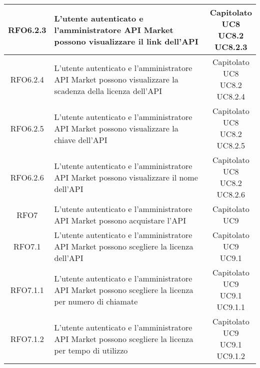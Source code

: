 \begin{longtable}{|c|p{8cm}|c|}
RFO6.2.3 &  L'utente autenticato e l'amministratore API Market possono visualizzare il link dell'API & \makecell*{Capitolato\\UC8\\UC8.2\\UC8.2.3} \\
\hline

RFO6.2.4 &  L'utente autenticato e l'amministratore API Market possono visualizzare la scadenza della licenza dell'API & \makecell*{Capitolato\\UC8\\UC8.2\\UC8.2.4} \\
\hline

RFO6.2.5 &  L'utente autenticato e l'amministratore API Market possono visualizzare la chiave dell'API & \makecell*{Capitolato\\UC8\\UC8.2\\UC8.2.5} \\
\hline

RFO6.2.6 &  L'utente autenticato e l'amministratore API Market possono visualizzare il nome dell'API & \makecell*{Capitolato\\UC8\\UC8.2\\UC8.2.6} \\
\hline

RFO7 & L'utente autenticato e l'amministratore API Market possono acquistare l'API & \makecell*{Capitolato\\UC9} \\
\hline

RFO7.1 &  L'utente autenticato e l'amministratore API Market possono scegliere la licenza dell'API & \makecell*{Capitolato\\UC9\\UC9.1} \\
\hline

RFO7.1.1 &  L'utente autenticato e l'amministratore API Market possono scegliere la licenza per numero di chiamate & \makecell*{Capitolato\\UC9\\UC9.1\\UC9.1.1} \\
\hline

RFO7.1.2 &  L'utente autenticato e l'amministratore API Market possono scegliere la licenza per tempo di utilizzo & \makecell*{Capitolato\\UC9\\UC9.1\\UC9.1.2} \\
\hline


\end{longtable}
